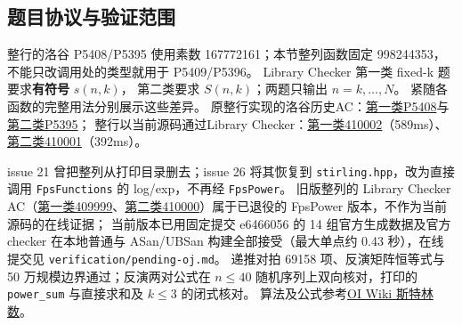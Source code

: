 \subsection{题目协议与验证范围}
整行的洛谷 P5408/P5395 使用素数 167772161；本节整列函数固定 998244353，
不能只改调用处的类型就用于 P5409/P5396。
Library Checker 第一类 fixed-k 题要求\textbf{有符号} $s(n,k)$，
第二类要求 $S(n,k)$；两题只输出 $n=k,\ldots,N$。
紧随各函数的完整用法分别展示这些差异。
原整行实现的洛谷历史AC：\href{https://www.luogu.com.cn/record/297627360}{第一类P5408}与\href{https://www.luogu.com.cn/record/297626422}{第二类P5395}；
整行以当前源码通过Library Checker：\href{https://judge.yosupo.jp/submission/410002}{第一类410002}（589ms）、\href{https://judge.yosupo.jp/submission/410001}{第二类410001}（392ms）。

issue 21 曾把整列从打印目录删去；issue 26 将其恢复到 \texttt{stirling.hpp}，改为直接调用 \texttt{FpsFunctions} 的 log/exp，不再经 \texttt{FpsPower}。
旧版整列的 Library Checker AC（\href{https://judge.yosupo.jp/submission/409999}{第一类409999}、\href{https://judge.yosupo.jp/submission/410000}{第二类410000}）属于已退役的 FpsPower 版本，不作为当前源码的在线证据；
当前版本已用固定提交 e6466056 的 14 组官方生成数据及官方 checker 在本地普通与 ASan/UBSan 构建全部接受（最大单点约 0.43 秒），在线提交见 \texttt{verification/pending-oj.md}。
递推对拍 69158 项、反演矩阵恒等式与 50 万规模边界通过；反演两对公式在 $n\le40$ 随机序列上双向核对，打印的 \texttt{power\_sum} 与直接求和及 $k\le3$ 的闭式核对。
算法及公式参考\href{https://oi-wiki.org/math/combinatorics/stirling/}{OI Wiki 斯特林数}。
